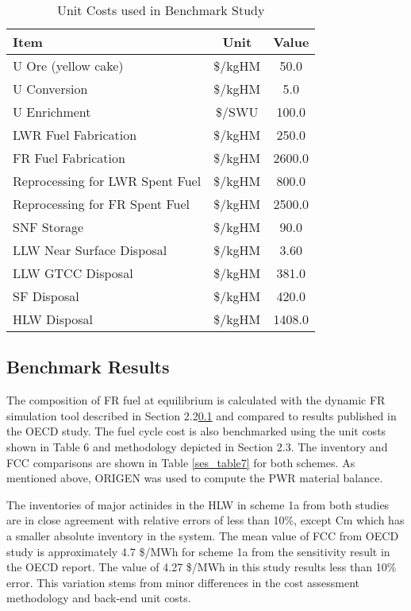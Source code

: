 \begin{table}[htbp]
\begin{center}
\caption{Unit Costs used in Benchmark Study}
\label{ses_table6}
\begin{tabular}{|l|c|c|}
\hline
\textbf{Item}                   & \textbf{Unit} & \textbf{Value} \\
\hline
U Ore (yellow cake)             & \$/kgHM       & 50.0 \\
U Conversion                    & \$/kgHM       & 5.0 \\
U Enrichment                    & \$/SWU        & 100.0 \\
LWR Fuel Fabrication            & \$/kgHM       & 250.0 \\
FR Fuel Fabrication             & \$/kgHM       & 2600.0 \\
Reprocessing for LWR Spent Fuel & \$/kgHM       & 800.0 \\
Reprocessing for FR Spent Fuel  & \$/kgHM       & 2500.0 \\
SNF Storage                     & \$/kgHM       & 90.0 \\
LLW Near Surface Disposal       & \$/kgHM       & 3.60 \\
LLW GTCC Disposal               & \$/kgHM       & 381.0 \\
SF Disposal                     & \$/kgHM       & 420.0 \\
HLW Disposal                    & \$/kgHM       & 1408.0 \\
\hline
\end{tabular}
\end{center}
\end{table}



\subsection{Benchmark Results}
\label{ses_sec:benchmark_results}
The composition of FR fuel at equilibrium is calculated with the
dynamic FR simulation tool described in Section 2.2\ref{} and compared to
results published in the OECD study.  The fuel cycle cost is also
benchmarked using the unit costs shown in Table 6 and methodology
depicted in Section 2.3.  The inventory and FCC comparisons are shown in
Table \ref{ses_table7} for both schemes.  As mentioned above, ORIGEN was used to
compute the PWR material balance.

The inventories of major actinides in the HLW in scheme 1a from both
studies are in close agreement with relative errors of less than 10\%,
except Cm which has a smaller absolute inventory in the system. The mean
value of FCC from OECD study is approximately 4.7 \$/MWh for scheme 1a
from the sensitivity result in the OECD report. The value of 4.27 \$/MWh
in this study results less than 10\% error.  This variation stems from
minor differences in the cost assessment methodology and back-end unit
costs. 

